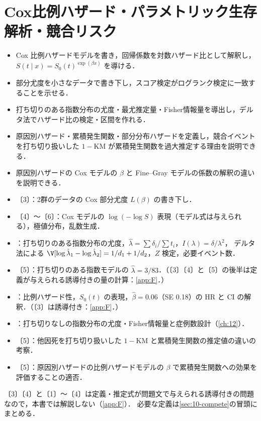 \chapter[Cox比例ハザード・パラメトリック生存解析・競合リスク]{Cox比例ハザード・パラメトリック生存解析・競合リスク}\label{ch:10}

\begin{goalbox}
\begin{itemize}
\item Cox 比例ハザードモデルを書き，回帰係数を対数ハザード比として解釈し，$S(t\mid x)=S_0(t)^{\exp(\beta x)}$ を導ける．
\item 部分尤度を小さなデータで書き下し，スコア検定がログランク検定に一致することを示せる．
\item 打ち切りのある指数分布の尤度・最尤推定量・Fisher情報量を導出し，デルタ法でハザード比の検定・区間を作れる．
\item 原因別ハザード・累積発生関数・部分分布ハザードを定義し，競合イベントを打ち切り扱いした $1-\mathrm{KM}$ が累積発生関数を過大推定する理由を説明できる．
\item 原因別ハザードの Cox モデルの $\beta$ と Fine--Gray モデルの係数の解釈の違いを説明できる．
\end{itemize}
\end{goalbox}

\begin{exambox}
\begin{itemize}
\item {}〔3〕：2群のデータの Cox 部分尤度 $L(\beta)$ の書き下し．
\item {}〔4〕〜〔6〕：Cox モデルの $\log(-\log S)$ 表現（モデル式は与えられる），極値分布，乱数生成．
\item {}：打ち切りのある指数分布の尤度，$\hat\lambda=\sum\delta_i/\sum t_i$，$I(\lambda)=\delta/\lambda^2$，
      デルタ法による $\V[\log\hat\lambda_1-\log\hat\lambda_2]=1/d_1+1/d_2$，$Z$ 検定，必要イベント数．
\item {}〔5〕：打ち切りのある指数モデルの $\hat\lambda=3/83$．（〔3〕〔4〕と〔5〕の後半は定義が与えられる誘導付きの量の計算：\cref{app:F}．）
\item {}：比例ハザード性，$S_0(t)$ の表現，$\hat\beta=0.06$（SE 0.18）の HR と CI の解釈．（〔3〕は誘導付き：\cref{app:F}．）
\item {}：打ち切りなしの指数分布の尤度・Fisher情報量と症例数設計（\cref{ch:12}）．
\item {}〔5〕：他因死を打ち切り扱いした $1-\mathrm{KM}$ と累積発生関数の推定値の違いの考察．
\item {}〔5〕：原因別ハザードの比例ハザードモデルの $\beta$ で累積発生関数への効果を評価することの適否．
\end{itemize}
〔3〕〔4〕と〔1〕〜〔4〕は定義・推定式が問題文で与えられる誘導付きの問題なので，本書では解説しない（\cref{app:F}）．
必要な定義は\cref{sec:10-compete}の冒頭にまとめる．
\end{exambox}

